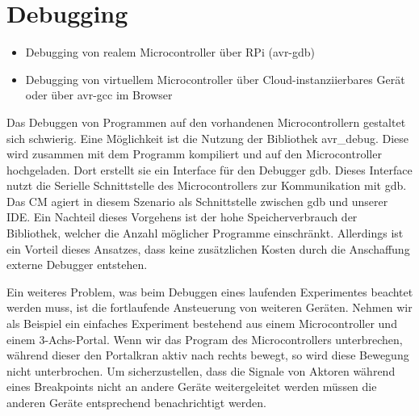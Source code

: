 \section{Debugging} \label{debugging}

\begin{itemize}
    \item Debugging von realem Microcontroller über RPi (avr-gdb)
    \item Debugging von virtuellem Microcontroller über Cloud-instanziierbares Gerät oder über avr-gcc im Browser
\end{itemize}

Das Debuggen von Programmen auf den vorhandenen Microcontrollern gestaltet sich schwierig. Eine Möglichkeit ist die Nutzung der Bibliothek avr\_debug. Diese wird zusammen mit dem Programm kompiliert und auf den Microcontroller hochgeladen. Dort erstellt sie ein Interface für den Debugger gdb. Dieses Interface nutzt die Serielle Schnittstelle des Microcontrollers zur Kommunikation mit gdb. Das CM agiert in diesem Szenario als Schnittstelle zwischen gdb und unserer IDE. Ein Nachteil dieses Vorgehens ist der hohe Speicherverbrauch der Bibliothek, welcher die Anzahl möglicher Programme einschränkt. Allerdings ist ein Vorteil dieses Ansatzes, dass keine zusätzlichen Kosten durch die Anschaffung externe Debugger entstehen.

Ein weiteres Problem, was beim Debuggen eines laufenden Experimentes beachtet werden muss, ist die fortlaufende Ansteuerung von weiteren Geräten. Nehmen wir als Beispiel ein einfaches Experiment bestehend aus einem Microcontroller und einem 3-Achs-Portal. Wenn wir das Program des Microcontrollers unterbrechen, während dieser den Portalkran aktiv nach rechts bewegt, so wird diese Bewegung nicht unterbrochen. Um sicherzustellen, dass die Signale von Aktoren während eines Breakpoints nicht an andere Geräte weitergeleitet werden müssen die anderen Geräte entsprechend benachrichtigt werden.